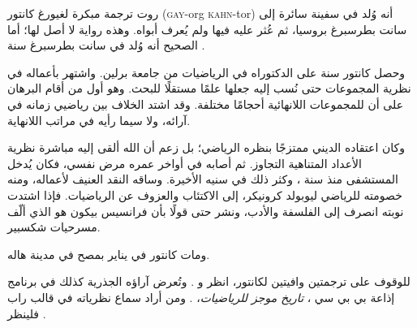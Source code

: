 \documentclass[../../../include/open-logic-section]{subfiles}
\begin{document}



روت ترجمة مبكرة لغيورغ كانتور (\textsc{gay}-org
\textsc{kahn}-tor) أنه وُلد في سفينة سائرة إلى سانت بطرسبرغ بروسيا،
ثم عُثر عليه فيها ولم يُعرف أبواه. وهذه رواية لا أصل لها؛ أما الصحيح
أنه وُلد في سانت بطرسبرغ سنة .

وحصل كانتور سنة  على الدكتوراه في الرياضيات من جامعة برلين. واشتهر
بأعماله في نظرية المجموعات حتى نُسب إليه جعلها علمًا مستقلًا للبحث. وهو
أول من أقام البرهان على أن للمجموعات اللانهائية أحجامًا مختلفة. وقد
اشتد الخلاف بين رياضيي زمانه في آرائه، ولا سيما رأيه في مراتب اللانهاية.

وكان اعتقاده الديني ممتزجًا بنظره الرياضي؛ بل زعم أن الله ألقى إليه
مباشرة نظرية الأعداد المتناهية التجاوز. ثم أصابه في أواخر عمره مرض
نفسي، فكان يُدخل المستشفى منذ سنة ، وكثر ذلك في سنيه الأخيرة.
وساقه النقد العنيف لأعماله، ومنه خصومته للرياضي ليوبولد كرونيكر، إلى
الاكتئاب والعزوف عن الرياضيات. فإذا اشتدت نوبته انصرف إلى الفلسفة
والأدب، ونشر حتى قولًا بأن فرانسيس بيكون هو الذي ألّف مسرحيات شكسبير.

ومات كانتور في  يناير  بمصح في مدينة هاله.

\begin{reading}
للوقوف على ترجمتين وافيتين لكانتور، انظر \citet{Dauben1990} و
\citet{Grattan-Guinness1971}. وتُعرض آراؤه الجذرية كذلك في برنامج
إذاعة بي بي سي ، \emph{تاريخ موجز للرياضيات}، \citep{Sautoy2014}.
ومن أراد سماع نظرياته في قالب راب فلينظر \citet{Rose2012}.
\end{reading}
\end{document}
